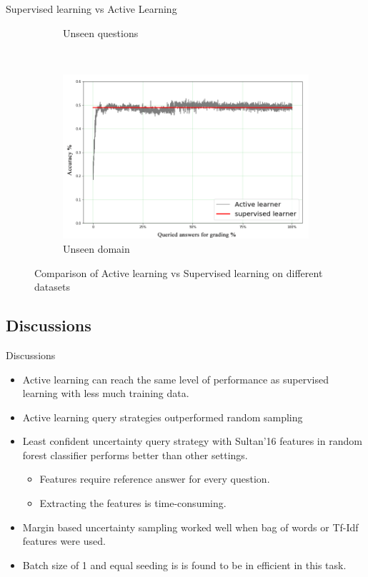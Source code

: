 \documentclass{beamer}
\begin{document}
\begin{frame}{Supervised learning vs Active Learning}
\begin{figure}[!htb]
\begin{subfigure}[b]{0.30\textwidth}
									\caption{Unseen questions}
					\label{mohlerdisagreement}
				\end{subfigure}
				~
				\begin{subfigure}[b]{0.30\textwidth}
					\includegraphics[width=\textwidth]{images/Unseen_Domain}
									\caption{Unseen domain}
					\label{mohlergrades}
				\end{subfigure}
				\caption{Comparison of Active learning vs Supervised learning on different datasets}
			\end{figure}
\end{frame}
\subsection{Discussions}
\begin{frame}{Discussions}
\begin{itemize}
	\item Active learning can reach the same level of performance as supervised learning with less much training data.
	\item Active learning query strategies outperformed random sampling 
	\item Least confident uncertainty query strategy with Sultan'16 features in random forest classifier performs better than other settings.
	\begin{itemize}
		\item Features require reference answer for every question. 
		\item Extracting the features is time-consuming.
	\end{itemize}
	\item Margin based uncertainty sampling worked well when bag of words or Tf-Idf features were used.
	\item Batch size of 1 and equal seeding is is found to be in efficient in this task.
	
\end{itemize}	
\end{frame}
\end{document}
